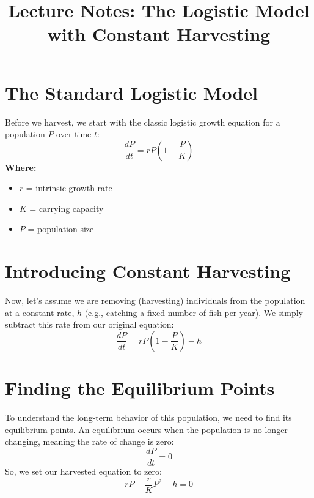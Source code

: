 \documentclass[12pt]{article}
\title{Lecture Notes: The Logistic Model with Constant Harvesting}
\author{}
\date{}
\begin{document}
\maketitle

\section{The Standard Logistic Model}
Before we harvest, we start with the classic logistic growth equation for a population $P$ over time $t$:
\begin{equation*}
\frac{dP}{dt} = rP \left( 1 - \frac{P}{K} \right)
\end{equation*}
\textbf{Where:}
\begin{itemize}
    \item $r$ = intrinsic growth rate
    \item $K$ = carrying capacity
    \item $P$ = population size
\end{itemize}

\section{Introducing Constant Harvesting}
Now, let's assume we are removing (harvesting) individuals from the population at a constant rate, $h$ (e.g., catching a fixed number of fish per year). We simply subtract this rate from our original equation:
\begin{equation*}
\frac{dP}{dt} = rP \left( 1 - \frac{P}{K} \right) - h
\end{equation*}

\section{Finding the Equilibrium Points}
To understand the long-term behavior of this population, we need to find its equilibrium points. An equilibrium occurs when the population is no longer changing, meaning the rate of change is zero:
\begin{equation*}
\frac{dP}{dt} = 0
\end{equation*}
So, we set our harvested equation to zero:
\begin{equation*}
rP - \frac{r}{K}P^2 - h = 0
\end{equation*}
\end{document}
